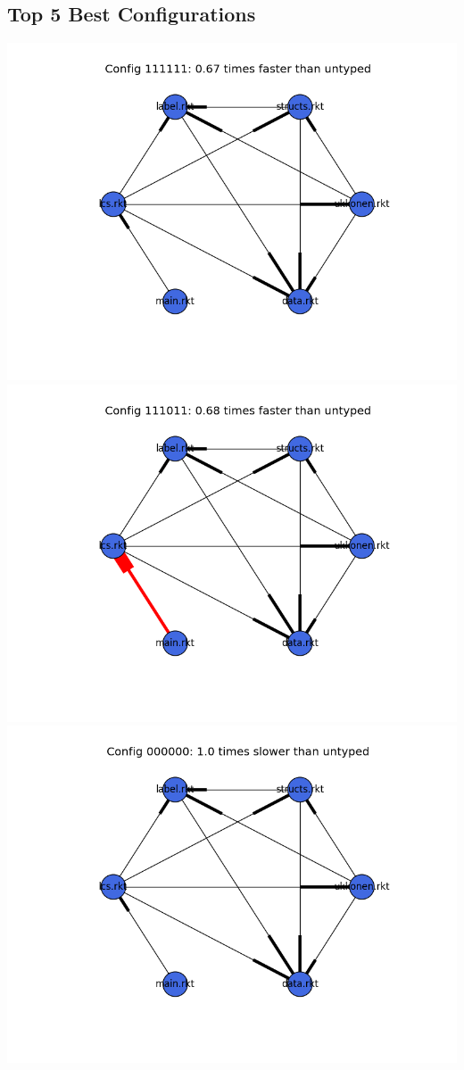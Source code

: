 \documentclass{article}
\begin{document}
\begin{itemize}
\subsection{Top 5 Best Configurations}
\includegraphics[width=\textwidth]{suffixtree-2015-04-02-module-graph-111111.png}
\includegraphics[width=\textwidth]{suffixtree-2015-04-02-module-graph-111011.png}
\includegraphics[width=\textwidth]{suffixtree-2015-04-02-module-graph-000000.png}

\end{itemize}
\end{document}
